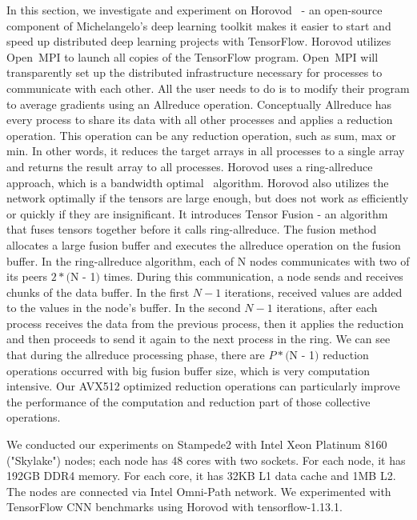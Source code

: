 \documentclass[sigconf]{acmart}
\newcommand{\ompi}[0]{Open~MPI\xspace}
\begin{document}
In this section, we investigate and experiment on Horovod~\cite{sergeev2018horovod} - an
open-source component of Michelangelo's deep learning toolkit makes it easier to start and 
speed up distributed deep learning projects with TensorFlow.
%
Horovod utilizes \ompi to launch all copies of the TensorFlow program. \ompi will transparently set up the distributed infrastructure necessary for processes to communicate with each other. All the user needs to do is to
modify their program to average gradients using an Allreduce operation. 
%
Conceptually Allreduce has every process to share its data with all other processes and applies a reduction operation. 
This operation can be any reduction operation, such as sum, max or min. 
In other words, it reduces the target arrays in all processes
to a single array and returns the result array to all processes. 
%
Horovod uses a ring-allreduce approach, which is a bandwidth optimal~\cite{allreduce-optimal} algorithm. 
Horovod also utilizes the network optimally if the tensors are large enough, but does not
work as efficiently or quickly if they are insignificant.
It introduces Tensor Fusion - an algorithm that fuses tensors together
before it calls ring-allreduce. The fusion method allocates a large fusion buffer and executes the
allreduce operation on the fusion buffer.
%
In the ring-allreduce algorithm, each of N nodes communicates with two of its
peers $2 * ($N - 1$)$ times. During this communication, a node sends and receives chunks of the data
buffer. In the first $N - 1$ iterations, received values are added to the values in the node's buffer. In
the second $N - 1$ iterations, after each process receives the data from the previous process, then it
applies the reduction and then proceeds to send it again to the next process in the ring. 
%
We can see that during the allreduce processing phase, there are $P * ($N - 1$)$ reduction operations
occurred with big fusion buffer size, which is very computation intensive.
Our AVX512 optimized reduction operations can particularly improve the performance 
of the computation and reduction part of those collective operations.

We conducted our experiments on Stampede2 with Intel Xeon Platinum 8160 ("Skylake") nodes; each node has 48 cores with two sockets. For each node, it has 192GB DDR4 memory. For each core, it has 32KB L1 data cache and 1MB L2. The nodes are connected via Intel Omni-Path network.
We experimented with TensorFlow CNN benchmarks using Horovod with tensorflow-1.13.1.
\end{document}
